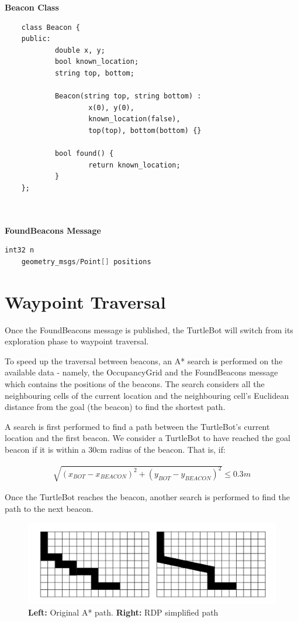 \documentclass[titlepage,12pt,a4paper]{article}
\begin{document}
\textbf{Beacon Class}
\begin{lstlisting}
	class Beacon {
	public:
    		double x, y;
    		bool known_location;
    		string top, bottom;

    		Beacon(string top, string bottom) :
        			x(0), y(0),
        			known_location(false),
        			top(top), bottom(bottom) {}

    		bool found() {
        			return known_location;
    		}
	};
	
\end{lstlisting}

\textbf{\\FoundBeacons Message}
\begin{lstlisting}[language=C++]
	int32 n
	geometry_msgs/Point[] positions
\end{lstlisting}

\pagebreak
\section{Waypoint Traversal}

Once the FoundBeacons message is published, the TurtleBot will switch from its exploration phase to waypoint traversal.

To speed up the traversal between beacons, an A* search is performed on the available data - namely, the OccupancyGrid and the FoundBeacons message which contains the positions of the beacons. The search considers all the neighbouring cells of the current location and the neighbouring cell's Euclidean distance from the goal (the beacon) to find the shortest path. 

A search is first performed to find a path between the TurtleBot's current location and the first beacon. We consider a TurtleBot to have reached the goal beacon if it is within a 30cm radius of the beacon. That is, if: 

\begin{align*}
	\sqrt{(x_{BOT} - x_{BEACON})^2 + (y_{BOT} - y_{BEACON})^2} \leq 0.3m 
\end{align*}

Once the TurtleBot reaches the beacon, another search is performed to find the path to the next beacon.

\begin{figure}[h]
  	\begin{center}
	\includegraphics[scale=0.27]{rdpExample.jpg}
	\caption{\textbf{Left:} Original A* path. \textbf{Right:} RDP simplified path}
	\end{center}
\end{figure}
\end{document}
